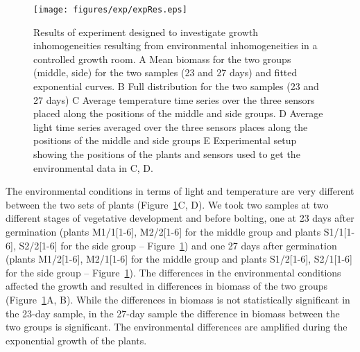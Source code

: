 
\begin{figure}[tb]
\centering
\texttt{[image: figures/exp/expRes.eps]}
\caption{ Results of experiment designed to investigate growth inhomogeneities
  resulting from environmental inhomogeneities in a controlled growth room. A
  Mean biomass for the two groups (middle, side) for the two samples (23 and 27
  days) and fitted exponential curves. B Full distribution for the two samples
  (23 and 27 days) C Average temperature time series over the three sensors
  placed along the positions of the middle and side groups. D Average light time
  series averaged over the three sensors places along the positions of the
  middle and side groups E Experimental setup showing the positions of the
  plants and sensors used to get the environmental data in C, D.  }
\label{fig:expRes}
\end{figure}

The environmental conditions in terms of light and temperature are very
different between the two sets of plants (Figure~\ref{fig:expRes}C, D). We took
two samples at two different stages of vegetative development and before
bolting, one at 23 days after germination (plants M1/1[1-6], M2/2[1-6] for the
middle group and plants S1/1[1-6], S2/2[1-6] for the side group --
Figure~\ref{fig:expRes}) and one 27 days after germination (plants M1/2[1-6],
M2/1[1-6] for the middle group and plants S1/2[1-6], S2/1[1-6] for the side
group -- Figure~\ref{fig:expRes}). The differences in the environmental
conditions affected the growth and resulted in differences in biomass of the two
groups (Figure~\ref{fig:expRes}A, B). While the differences in biomass is not
statistically significant in the 23-day sample, in the 27-day sample the
difference in biomass between the two groups is significant. The environmental
differences are amplified during the exponential growth of the plants.


